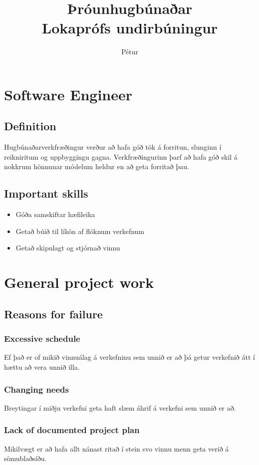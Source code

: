 \documentclass[openany]{article}
\begin{document}
\title{Þróunhugbúnaðar \\
Lokaprófs undirbúningur}
\author{Pétur}
\maketitle

\pagebreak

\tableofcontents

\pagebreak

\section{Software Engineer}
\subsection{Definition}
Hugbúnaðarverkfræðingur verður að hafa góð tök á forritun, slunginn í reikniritum og uppbyggingu gagna. Verkfræðingurinn þarf að hafa góð skil á nokkrum hönnunar módelum heldur en að geta forritað þau.
\subsection{Important skills}
\begin{itemize}
	\item Góða samskiftar hæfileika
	\item Getað búið til líkön af flóknum verkefnum
	\item Getað skipulagt og stjórnað vinnu
\end{itemize}
\section{General project work}
\subsection{Reasons for failure}
\subsubsection{Excessive schedule}
Ef það er of mikið vinnuálag á verkefninu sem unnið er að þá getur verkefnið átt í hættu að vera unnið illa.
\subsubsection{Changing needs}
Breytingar í miðju verkefni geta haft slæm áhrif á verkefni sem unnið er að.
\subsubsection{Lack of documented project plan}
Mikilvægt er að hafa allt nánast ritað í stein svo vinnu menn geta verið á sömublaðsíðu.
\end{document}
